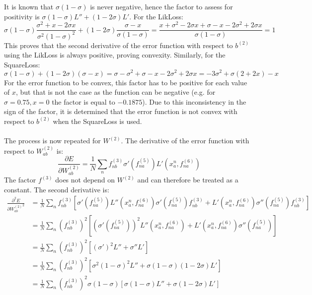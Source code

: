 \documentclass[fleqn]{report}
\begin{document}
It is known that $\sigma (1-\sigma)$ is never negative, hence the factor to assess for positivity is $\sigma(1-\sigma)L'' + (1-2\sigma)L'$. For the LikLoss:
\begin{equation}
    \sigma(1-\sigma)\frac{\sigma^2 + x -2\sigma x}{\sigma^2 (1-\sigma)^2} + (1-2\sigma)\frac{\sigma -x}{\sigma(1-\sigma)} = \frac{x + \sigma^2 -2\sigma x + \sigma -x -2\sigma^2 +2\sigma x}{\sigma(1-\sigma)} = 1
\end{equation}
This proves that the second derivative of the error function with respect to $b^{(2)}$ using the LikLoss is always positive, proving convexity. Similarly, for the SquareLoss:
\begin{equation}
        \sigma(1-\sigma) +(1-2\sigma)(\sigma-x) = \sigma - \sigma^2 + \sigma - x - 2\sigma^2 + 2\sigma x = -3\sigma^2 + \sigma(2+2x) - x
\end{equation}
For the error function to be convex, this factor has to be positive for each value of $x$, but that is not the case as the function can be negative (e.g. for $\sigma=0.75, x = 0$ the factor is equal to $-0.1875$). Due to this inconsistency in the sign of the factor, it is determined that the error function is not convex with respect to $b^{(2)}$ when the SquareLoss is used.\\ \ \\
The process is now repeated for $W^{(2)}$. The derivative of the error function with respect to $W^{(2)}_{ab}$ is:
\begin{equation}
    \frac{\partial E}{\partial W^{(2)}_{ab}} = \frac{1}{N} \sum_n f^{(3)}_{nb} \sigma'\left(f^{(5)}_{na}\right) L'\left(x^n_a, f^{(6)}_{na}\right)
\end{equation}
The factor $f^{(3)}$ does not depend on $W^{(2)}$ and can therefore be treated as a constant. The second derivative is:
\begin{equation}
    \begin{split}
        \frac{\partial ^2 E}{\partial {W^{(2)}_{ab}}^2} & = \frac{1}{N} \sum_n f^{(3)}_{nb} \left [
        \sigma'\left(f^{(5)}_{na}\right) L''\left(x^n_a, f^{(6)}_{na}\right) \sigma'\left(f^{(5)}_{na}\right) f^{(3)}_{nb} + L'\left(x^n_a, f^{(6)}_{na}\right) \sigma''\left(f^{(5)}_{na}\right) f^{(3)}_{nb}
        \right] \\
        & = \frac{1}{N} \sum_n \left(f^{(3)}_{nb}\right)^2 \left [
        \left(\sigma'\left(f^{(5)}_{na}\right)\right)^2 L''\left(x^n_a, f^{(6)}_{na}\right) + L'\left(x^n_a, f^{(6)}_{na}\right) \sigma''\left(f^{(5)}_{na}\right)
        \right] \\
        & = \frac{1}{N} \sum_n \left(f^{(3)}_{nb}\right)^2 \left[
        (\sigma ')^2 L'' + \sigma'' L' \right] \\
        & = \frac{1}{N} \sum_n \left(f^{(3)}_{nb}\right)^2 \left[
        \sigma^2 (1-\sigma)^2 L'' + \sigma (1-\sigma)(1-2 \sigma) L' \right] \\
        & = \frac{1}{N} \sum_n \left(f^{(3)}_{nb}\right)^2 \sigma (1-\sigma) \left[
        \sigma (1-\sigma) L'' + \sigma (1-2 \sigma) L' \right]
    \end{split}
\end{equation}
\end{document}
